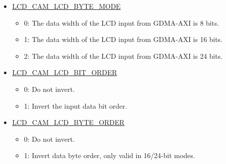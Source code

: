 \documentclass[main\_\_EN.tex]{subfiles}
\begin{document}
\begin{itemize}
    \item \hyperref[fielddesc:LCDCAMLCDBYTEMODE]{LCD\_CAM\_LCD\_BYTE\_MODE}
    \begin{itemize}
        \item 0: The data width of the LCD input from GDMA-AXI is 8 bits.
        \item 1: The data width of the LCD input from GDMA-AXI is 16 bits.
        \item 2: The data width of the LCD input from GDMA-AXI is 24 bits.
    \end{itemize}
    \item \hyperref[fielddesc:LCDCAMLCDBITORDER]{LCD\_CAM\_LCD\_BIT\_ORDER}
    \begin{itemize}
        \item 0: Do not invert.
        \item 1: Invert the input data bit order.
    \end{itemize}
    \item \hyperref[fielddesc:LCDCAMLCDBYTEORDER]{LCD\_CAM\_LCD\_BYTE\_ORDER}
    \begin{itemize}
        \item 0: Do not invert.
        \item 1: Invert data byte order, only valid in 16/24-bit modes.
    \end{itemize}
\end{itemize}
\end{document}
